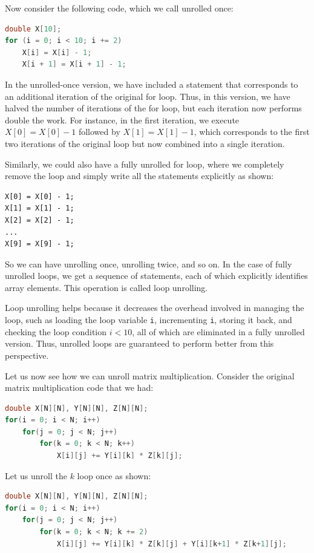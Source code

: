 \documentclass[12pt]{book}
\begin{document}
Now consider the following code, which we call unrolled once:
\begin{lstlisting}[language=C++, caption = Unrolled Once]
double X[10];
for (i = 0; i < 10; i += 2)
    X[i] = X[i] - 1;
    X[i + 1] = X[i + 1] - 1;
\end{lstlisting}

In the unrolled-once version, we have included a statement that corresponds to an additional iteration of the original for loop. Thus, in this version, we have halved the number of iterations of the for loop, but each iteration now performs double the work. For instance, in the first iteration, we execute $X[0] = X[0] - 1$ followed by $X[1] = X[1] - 1$, which corresponds to the first two iterations of the original loop but now combined into a single iteration.

Similarly, we could also have a fully unrolled for loop, where we completely remove the loop and simply write all the statements explicitly as shown:
\begin{lstlisting}
X[0] = X[0] - 1;
X[1] = X[1] - 1;
X[2] = X[2] - 1;
...
X[9] = X[9] - 1;
\end{lstlisting}

So we can have unrolling once, unrolling twice, and so on. In the case of fully unrolled loops, we get a sequence of statements, each of which explicitly identifies array elements. This operation is called loop unrolling.

Loop unrolling helps because it decreases the overhead involved in managing the loop, such as loading the loop variable \texttt{i}, incrementing \texttt{i}, storing it back, and checking the loop condition $i < 10$, all of which are eliminated in a fully unrolled version. Thus, unrolled loops are guaranteed to perform better from this perspective.

Let us now see how we can unroll matrix multiplication. Consider the original matrix multiplication code that we had:
\begin{lstlisting}[language=C++]
double X[N][N], Y[N][N], Z[N][N];
for(i = 0; i < N; i++)
    for(j = 0; j < N; j++)
        for(k = 0; k < N; k++)
            X[i][j] += Y[i][k] * Z[k][j];
\end{lstlisting}

Let us unroll the $k$ loop once as shown:
\begin{lstlisting}[language=C++]
double X[N][N], Y[N][N], Z[N][N];
for(i = 0; i < N; i++)
    for(j = 0; j < N; j++)
        for(k = 0; k < N; k += 2)
            X[i][j] += Y[i][k] * Z[k][j] + Y[i][k+1] * Z[k+1][j];
\end{lstlisting}
\end{document}
